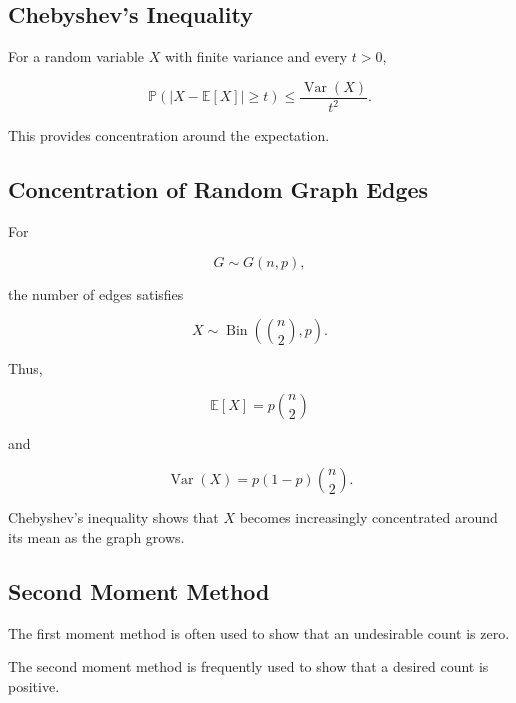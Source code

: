 \subsection{Chebyshev's Inequality}
\label{subsec:chebyshev-combinatorics}

\begin{theorem}
For a random variable \(X\) with finite variance and every \(t>0\),

\[
\boxed{
\mathbb{P}
\left(
|X-\mathbb{E}[X]|\geq t
\right)
\leq
\frac{\operatorname{Var}(X)}{t^2}.
}
\]
\end{theorem}

This provides concentration around the expectation.

\subsection{Concentration of Random Graph Edges}
\label{subsec:random-graph-edge-concentration}

For

\[
G\sim G(n,p),
\]

the number of edges satisfies

\[
X
\sim
\operatorname{Bin}
\left(
\binom n2,p
\right).
\]

Thus,

\[
\mathbb{E}[X]
=
p\binom n2
\]

and

\[
\operatorname{Var}(X)
=
p(1-p)\binom n2.
\]

Chebyshev's inequality shows that \(X\) becomes increasingly
concentrated around its mean as the graph grows.

\subsection{Second Moment Method}
\label{subsec:second-moment-method}

The first moment method is often used to show that an undesirable count
is zero.

The second moment method is frequently used to show that a desired
count is positive.

